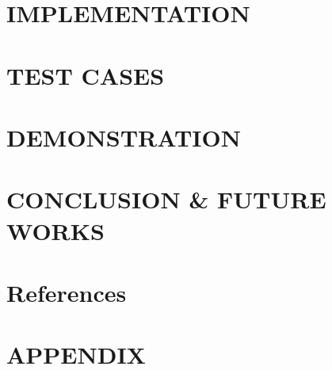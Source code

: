 \documentclass[12pt, twoside]{report}
\makeatletter
\newcommand\AppendixName{Appendix}
\let\oldappendix\appendix
\renewcommand{\appendix}{%
  \oldappendix
  \renewcommand{\chaptername}{\AppendixName}
  \renewcommand{\thechapter}{\@Alph\c@chapter}}
\makeatother
\begin{document}
\chapter{IMPLEMENTATION}


\chapter{TEST CASES}


\chapter{DEMONSTRATION}


\chapter{CONCLUSION \& FUTURE WORKS}


\chapter*{References}


\appendix
\chapter*{APPENDIX}

\end{document}

